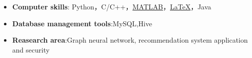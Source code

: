  \begin{itemize}[leftmargin=*]
    \item \textbf{Computer skills}: Python，C/C++，\href{https://www.mathworks.com/}{MATLAB}，\href{https://www.latex-project.org/}{\LaTeX}，Java
   \item \textbf{Database management tools}:MySQL,Hive
	\item \textbf{Reasearch area}:Graph neural network, recommendation system application and security
  \end{itemize}
